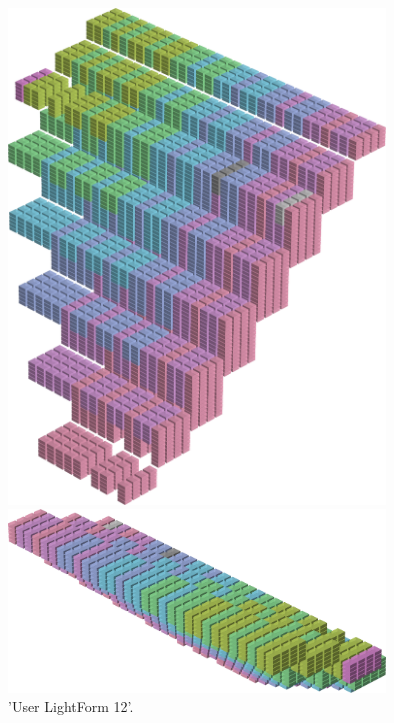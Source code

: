 \begin{minipage}[b]{0.48\linewidth}
\vspace{2cm}
\begin{figure}[H]
    \centering
    \begin{adjustbox}{width=4cm,margin=0cm 0cm}
      \includegraphics[width=10cm]{src/colorspace_patterns/pattern20-45.png}%
    \end{adjustbox}
    \begin{adjustbox}{width=4cm,margin=0cm 0cm}
      \includegraphics[width=10cm]{src/colorspace_patterns/pattern20-225.png}%
    \end{adjustbox}
\caption{'User LightForm 12'.}
\end{figure}
\end{minipage}
